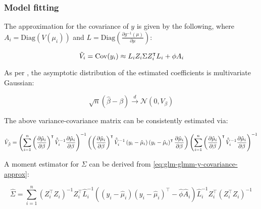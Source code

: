 \documentclass{report}
\begin{document}
\subsubsection{Model fitting}

The approximation for the covariance of $y$ is given by the following, where $A_i = \text{Diag}\left(V(\mu_i)\right)$ and $L = \text{Diag}\left(\frac{\partial g^{-1}(\mu)}{\partial\mu}\right)$:

\begin{equation}\label{eq:glm-glmm-y-covariance-approx}
    \Tilde{V}_i = \text{Cov}(y_i) \approx L_i Z_i \Sigma Z_i^\intercal L_i + \phi A_i
\end{equation}

As per \cite{zeger_models_1988}, the asymptotic distribution of the estimated coefficients is multivariate Gaussian:

\begin{equation}\label{eq:glm-glmm-beta-asymptotics}
    \sqrt{n}\left(\hat{\beta} - \beta\right) \overset{d}{\to} \mathcal{N}\left(0, V_\beta\right)
\end{equation}

The above variance-covariance matrix can be consistently estimated via:

\begin{equation}\label{eq:glm-glmm-beta-vcov-estimator}
    \hat{V}_{\hat{\beta}} = \left(\sum_{i=1}^n\left(\frac{\partial\hat{\mu}_i}{\partial\beta}\right)^\intercal \hat{\Tilde{V}}^{-1}_i \frac{\partial\hat{\mu}_i}{\partial\beta}\right)^{-1} \left(\left(\frac{\partial\hat{\mu}_i}{\partial\beta}\right)^\intercal \hat{\Tilde{V}}^{-1}_i \left(y_i - \hat{\mu}_i\right)\left(y_i - \hat{\mu}_i\right)^\intercal \frac{\partial\hat{\mu}_i}{\partial\beta}\right) \left(\sum_{i=1}^n\left(\frac{\partial\hat{\mu}_i}{\partial\beta}\right)^\intercal \hat{\Tilde{V}}^{-1}_i \frac{\partial\hat{\mu}_i}{\partial\beta}\right)^{-1}
\end{equation}

A moment estimator for $\Sigma$ can be derived from \ref{eq:glm-glmm-y-covariance-approx}:

\begin{equation}\label{eq:glm-glmm-Sigma-estimator}
    \hat{\Sigma} = \sum_{i=1}^n \left(Z_i^\intercal Z_i\right)^{-1} Z_i^\intercal \hat{L}^{-1}_i \left(\left(y_i - \hat{\mu}_i\right)\left(y_i - \hat{\mu}_i\right)^\intercal - \hat{\phi}\hat{A}_i\right) \hat{L}^{-1}_i Z_i^\intercal \left(Z_i^\intercal Z_i\right)^{-1}
\end{equation}
\end{document}
